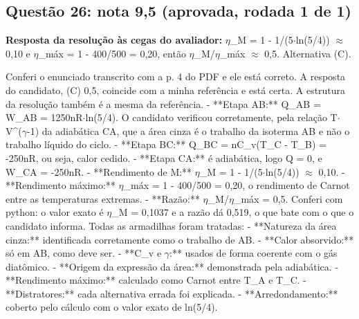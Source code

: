 \documentclass{article}%
\begin{document}
\subsection*{Questão 26: nota 9,5 (aprovada, rodada 1 de 1)}%
\textbf{Resposta da resolução às cegas do avaliador:} $\eta$\_M = 1 - 1/(5$\cdot$ln(5/4)) $\approx$ 0,10 e $\eta$\_máx = 1 - 400/500 = 0,20, então $\eta$\_M/$\eta$\_máx $\approx$ 0,5. Alternativa (C).\par %
Conferi o enunciado transcrito com a p. 4 do PDF e ele está correto. A resposta do candidato, (C) 0,5, coincide com a minha referência e está certa. A estrutura da resolução também é a mesma da referência.\newline%
{-} **Etapa AB:** Q\_AB = W\_AB = 1250nR$\cdot$ln(5/4). O candidato verificou corretamente, pela relação T$\cdot$V\^{}($\gamma$-1) da adiabática CA, que a área cinza é o trabalho da isoterma AB e não o trabalho líquido do ciclo.\newline%
{-} **Etapa BC:** Q\_BC = nC\_v(T\_C - T\_B) = -250nR, ou seja, calor cedido.\newline%
{-} **Etapa CA:** é adiabática, logo Q = 0, e W\_CA = -250nR.\newline%
{-} **Rendimento de M:** $\eta$\_M = 1 - 1/(5$\cdot$ln(5/4)) $\approx$ 0,10.\newline%
{-} **Rendimento máximo:** $\eta$\_máx = 1 - 400/500 = 0,20, o rendimento de Carnot entre as temperaturas extremas.\newline%
{-} **Razão:** $\eta$\_M/$\eta$\_máx = 0,5. Conferi com python: o valor exato é $\eta$\_M = 0,1037 e a razão dá 0,519, o que bate com o que o candidato informa.\newline%
\newline%
Todas as armadilhas foram tratadas:\newline%
{-} **Natureza da área cinza:** identificada corretamente como o trabalho de AB.\newline%
{-} **Calor absorvido:** só em AB, como deve ser.\newline%
{-} **C\_v e $\gamma$:** usados de forma coerente com o gás diatômico.\newline%
{-} **Origem da expressão da área:** demonstrada pela adiabática.\newline%
{-} **Rendimento máximo:** calculado como Carnot entre T\_A e T\_C.\newline%
{-} **Distratores:** cada alternativa errada foi explicada.\newline%
{-} **Arredondamento:** coberto pelo cálculo com o valor exato de ln(5/4).\newline%
\end{document}
